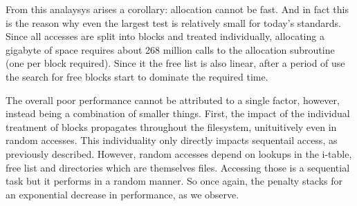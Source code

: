         From this analaysys arises a corollary: allocation cannot be fast. And
        in fact this is the reason why even the largest test is relatively
        small for today's standards. Since all accesses are split into blocks
        and treated individually, allocating a gigabyte of space requires about
        268 million calls to the allocation subroutine (one per block
        required). Since it the free list is also linear, after a period of use
        the search for free blocks start to dominate the required time.



        The overall poor performance cannot be attributed to a single factor,
        however, instead being a combination of smaller things. First, the
        impact of the individual treatment of blocks propagates throughout the
        filesystem, unituitively even in random accesses. This individuality
        only directly impacts sequentail access, as previously described.
        However, random accesses depend on lookups in the i-table, free list
        and directories which are themselves files. Accessing those is a
        sequential task but it performs in a random manner. So once again, the
        penalty stacks for an exponential decrease in performance, as we
        observe.





